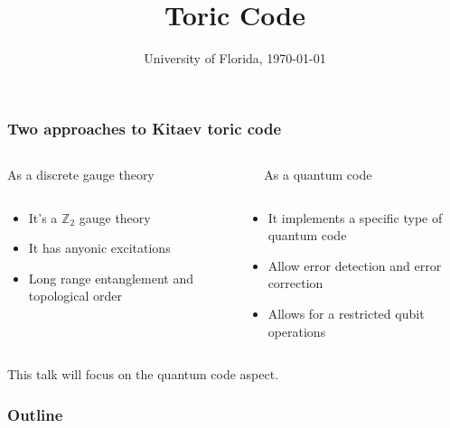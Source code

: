 \documentclass{beamer}
\title{Toric Code}
\date{University of Florida, \today}
\renewcommand{\(}{\left(}
\renewcommand{\)}{\right)}
\renewcommand{\[}{\left[}
\renewcommand{\]}{\right]}
\begin{document}
\frame{\titlepage} 

\begin{frame}
    \frametitle{Two approaches to Kitaev toric code \citep{Kitaev_2003}}

    \begin{columns}
        \begin{column}{0.5\textwidth}
            \begin{center}
            As a discrete gauge theory
            \end{center}
        \end{column}
        \begin{column}{0.5\textwidth}
            \begin{center}
            As a quantum code
            \end{center}
        \end{column}
    \end{columns}

    \begin{columns}
        \begin{column}{0.5\textwidth}
            \begin{itemize}
                \item It's a $\mathbb{Z}_2$ gauge theory
                \item It has anyonic excitations
                \item Long range entanglement and topological order
            \end{itemize}
        \end{column}
        \begin{column}{0.5\textwidth}
            \begin{itemize}
                \item It implements a specific type of quantum code
                \item Allow error detection and error correction
                \item Allows for a restricted qubit operations
            \end{itemize}
        \end{column}
    \end{columns}
    \vspace{10pt}
    \pause
    \begin{center}
        \begin{framed}
            This talk will focus on the quantum code aspect. 
            \end{framed}
    \end{center}
\end{frame}
\begin{frame}
    \frametitle{Outline}

    \tableofcontents

\end{frame}
\end{document}
